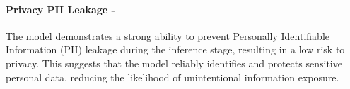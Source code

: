 \paragraph{Privacy PII Leakage - \low}

The model demonstrates a strong ability to prevent Personally Identifiable Information (PII) leakage during the inference stage, resulting in a low risk to privacy. This suggests that the model reliably identifies and protects sensitive personal data, reducing the likelihood of unintentional information exposure.
